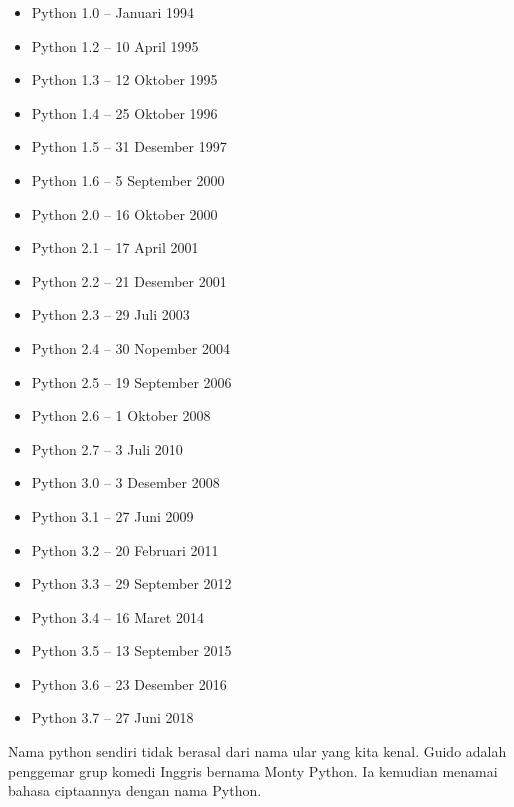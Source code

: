 \begin{itemize}

\item   Python 1.0 – Januari 1994
\item	Python 1.2 – 10 April 1995
\item	Python 1.3 – 12 Oktober 1995
\item	Python 1.4 – 25 Oktober 1996
\item	Python 1.5 – 31 Desember 1997
\item	Python 1.6 – 5 September 2000
\item	Python 2.0 – 16 Oktober 2000
\item	Python 2.1 – 17 April 2001
\item	Python 2.2 – 21 Desember 2001
\item	Python 2.3 – 29 Juli 2003
\item	Python 2.4 – 30 Nopember 2004
\item	Python 2.5 – 19 September 2006
\item	Python 2.6 – 1 Oktober 2008
\item	Python 2.7 – 3 Juli 2010
\item	Python 3.0 – 3 Desember 2008
\item	Python 3.1 – 27 Juni 2009
\item	Python 3.2 – 20 Februari 2011
\item	Python 3.3 – 29 September 2012
\item	Python 3.4 – 16 Maret 2014
\item	Python 3.5 – 13 September 2015
\item	Python 3.6 – 23 Desember 2016
\item	Python 3.7 – 27 Juni 2018
\end{itemize}
	
Nama python sendiri tidak berasal dari nama ular yang kita kenal. Guido adalah penggemar grup komedi Inggris bernama Monty Python. Ia kemudian menamai bahasa ciptaannya dengan nama Python.

\par



